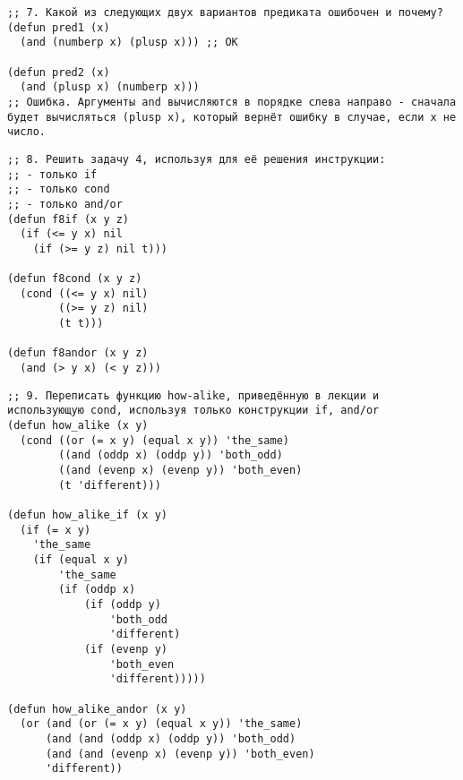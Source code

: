 \documentclass[a4paper,oneside,14pt]{extarticle}
\begin{document}
\begin{lstlisting}
;; 7. Какой из следующих двух вариантов предиката ошибочен и почему?
(defun pred1 (x)
  (and (numberp x) (plusp x))) ;; OK

(defun pred2 (x)
  (and (plusp x) (numberp x)))
;; Ошибка. Аргументы and вычисляются в порядке слева направо - сначала будет вычисляться (plusp x), который вернёт ошибку в случае, если x не число.
\end{lstlisting}

\begin{lstlisting}
;; 8. Решить задачу 4, используя для её решения инструкции:
;; - только if
;; - только cond
;; - только and/or
(defun f8if (x y z)
  (if (<= y x) nil
    (if (>= y z) nil t)))

(defun f8cond (x y z)
  (cond ((<= y x) nil)
        ((>= y z) nil)
        (t t)))

(defun f8andor (x y z)
  (and (> y x) (< y z)))
\end{lstlisting}

\newpage

\begin{lstlisting}
;; 9. Переписать функцию how-alike, приведённую в лекции и использующую cond, используя только конструкции if, and/or
(defun how_alike (x y)
  (cond ((or (= x y) (equal x y)) 'the_same)
        ((and (oddp x) (oddp y)) 'both_odd)
        ((and (evenp x) (evenp y)) 'both_even)
        (t 'different)))

(defun how_alike_if (x y)
  (if (= x y)
    'the_same
    (if (equal x y)
        'the_same
        (if (oddp x)
            (if (oddp y)
                'both_odd
                'different)
            (if (evenp y)
                'both_even
                'different)))))

(defun how_alike_andor (x y)
  (or (and (or (= x y) (equal x y)) 'the_same)
      (and (and (oddp x) (oddp y)) 'both_odd)
      (and (and (evenp x) (evenp y)) 'both_even)
      'different))
\end{lstlisting}

\end{document}
